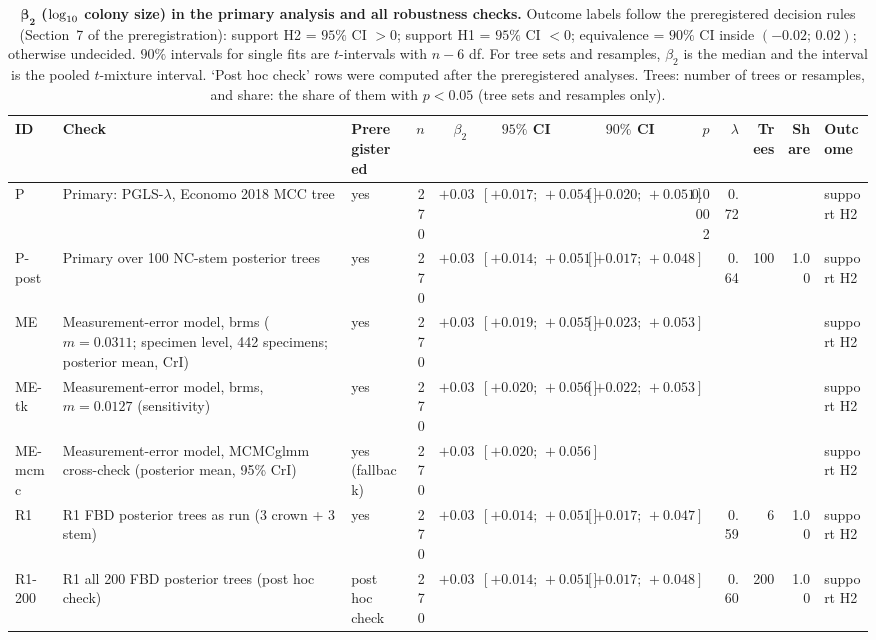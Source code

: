 \begin{table}
\centering
\caption[$\beta_2$ in the primary analysis and all robustness checks]{\textbf{$\boldsymbol{\beta_2}$ ($\log_{10}$ colony
size) in the primary analysis and all robustness checks.} Outcome labels follow the preregistered decision rules (Section~7 of the preregistration): support H2 = $95\%$ CI $> 0$; support H1 = $95\%$ CI $< 0$; equivalence = $90\%$ CI inside $(-0.02;\,0.02)$; otherwise undecided. $90\%$ intervals for single fits are $t$-intervals with $n - 6$ df. For tree sets and resamples, $\beta_2$ is the median and the interval is the pooled $t$-mixture interval. `Post hoc check' rows were computed after the preregistered analyses.
Trees: number of trees or resamples, and share: the share of them with $p < 0.05$ (tree sets and resamples only).}
\label{tab:robustness}
\fontsize{7}{8}\selectfont
\setlength{\tabcolsep}{3pt}
\begin{tabular}{@{}l>{\raggedright\arraybackslash}p{9.0cm}>{\raggedright\arraybackslash}p{1.9cm}rrccrrrrl@{}}
\toprule
ID & Check & Preregistered & $n$ & $\beta_2$ & $95\%$ CI & $90\%$ CI & $p$ & $\lambda$ & Trees & Share & Outcome \\
\midrule
P & Primary: PGLS-$\lambda$, Economo 2018 MCC tree & yes & 270 & $+0.035$ & $[+0.017;\,+0.054]$ & $[+0.020;\,+0.051]$ & 0.0002 & 0.72 &  &  & support H2 \\
P-post & Primary over 100 NC-stem posterior trees & yes & 270 & $+0.033$ & $[+0.014;\,+0.051]$ & $[+0.017;\,+0.048]$ &  & 0.64 & 100 & 1.00 & support H2 \\
ME & Measurement-error model, brms ($m = 0.0311$; specimen level, 442 specimens; posterior mean, CrI) & yes & 270 & $+0.038$ & $[+0.019;\,+0.055]$ & $[+0.023;\,+0.053]$ &  &  &  &  & support H2 \\
ME-tk & Measurement-error model, brms, $m = 0.0127$ (sensitivity) & yes & 270 & $+0.038$ & $[+0.020;\,+0.056]$ & $[+0.022;\,+0.053]$ &  &  &  &  & support H2 \\
ME-mcmc & Measurement-error model, MCMCglmm cross-check (posterior mean, 95\% CrI) & yes (fallback) & 270 & $+0.038$ & $[+0.020;\,+0.056]$ &  &  &  &  &  & support H2 \\
\midrule
R1 & R1 FBD posterior trees as run (3 crown + 3 stem) & yes & 270 & $+0.032$ & $[+0.014;\,+0.051]$ & $[+0.017;\,+0.047]$ &  & 0.59 & 6 & 1.00 & support H2 \\
R1-200 & R1 all 200 FBD posterior trees (post hoc check) & post hoc check & 270 & $+0.032$ & $[+0.014;\,+0.051]$ & $[+0.017;\,+0.048]$ &  & 0.60 & 200 & 1.00 & support H2 \\

\end{tabular}
\end{table}
